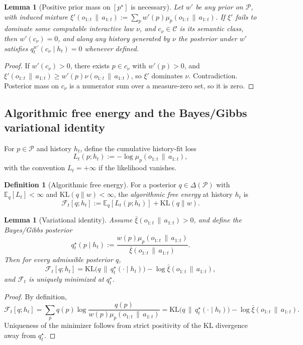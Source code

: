 \documentclass[11pt]{article}
\newtheorem{lemma}[theorem]{Lemma}
\theoremstyle{definition}
\newtheorem{definition}[theorem]{Definition}
\theoremstyle{remark}
\newcommand{\Ccal}{\mathcal{C}}
\newcommand{\Pcal}{\mathcal{P}}
\newcommand{\Fcal}{\mathcal{F}}
\newcommand{\E}{\mathbb{E}}
\newcommand{\KL}{\mathrm{KL}}
\newcommand{\givena}{\,\|\,}
\newcommand{\barxi}{\bar{\xi}}
\begin{document}
\begin{lemma}[{Positive prior mass on $[p^\star]$ is necessary}]
\label{lem:prior-necessity}
Let $w'$ be any prior on $\Pcal$, with induced mixture $\xi'(o_{1:t}\givena a_{1:t}):=\sum_p w'(p)\mu_p(o_{1:t}\givena a_{1:t})$. If $\xi'$ fails to dominate some computable interactive law $\nu$, and $c_\nu\in\Ccal$ is its semantic class, then $w'(c_\nu)=0$, and along any history generated by $\nu$ the posterior under $w'$ satisfies $q_t^{w'}(c_\nu\mid h_t)=0$ whenever defined.
\end{lemma}

\begin{proof}
If $w'(c_\nu)>0$, there exists $p\in c_\nu$ with $w'(p)>0$, and $\xi'(o_{1:t}\givena a_{1:t})\ge w'(p)\nu(o_{1:t}\givena a_{1:t})$, so $\xi'$ dominates $\nu$. Contradiction. Posterior mass on $c_\nu$ is a numerator sum over a measure-zero set, so it is zero.
\end{proof}

\subsection{Algorithmic free energy and the Bayes/Gibbs variational identity}

For $p\in\Pcal$ and history $h_t$, define the cumulative history-fit loss
\[
L_t(p;h_t):=-\log\mu_p(o_{1:t}\givena a_{1:t}),
\]
with the convention $L_t=+\infty$ if the likelihood vanishes.

\begin{definition}[Algorithmic free energy]
\label{def:afe}
For a posterior $q\in\Delta(\Pcal)$ with $\E_q[L_t]<\infty$ and $\KL(q\|w)<\infty$, the \emph{algorithmic free energy} at history $h_t$ is
\[
\Fcal_t[q;h_t]:=\E_q[L_t(p;h_t)]+\KL(q\|w).
\]
\end{definition}

\begin{lemma}[Variational identity]
\label{lem:variational}
Assume $\barxi(o_{1:t}\givena a_{1:t})>0$, and define the Bayes/Gibbs posterior
\[
q_t^\star(p\mid h_t):=\frac{w(p)\mu_p(o_{1:t}\givena a_{1:t})}{\barxi(o_{1:t}\givena a_{1:t})}.
\]
Then for every admissible posterior $q$,
\[
\Fcal_t[q;h_t]
=
\KL\!\bigl(q\,\|\,q_t^\star(\cdot\mid h_t)\bigr)-\log\barxi(o_{1:t}\givena a_{1:t}),
\]
and $\Fcal_t$ is uniquely minimized at $q_t^\star$.
\end{lemma}

\begin{proof}
By definition,
\[
\Fcal_t[q;h_t]=\sum_p q(p)\log\frac{q(p)}{w(p)\mu_p(o_{1:t}\givena a_{1:t})}
=\KL\!\bigl(q\,\|\,q_t^\star(\cdot\mid h_t)\bigr)-\log\barxi(o_{1:t}\givena a_{1:t}).
\]
Uniqueness of the minimizer follows from strict positivity of the KL divergence away from $q_t^\star$.
\end{proof}
\end{document}

